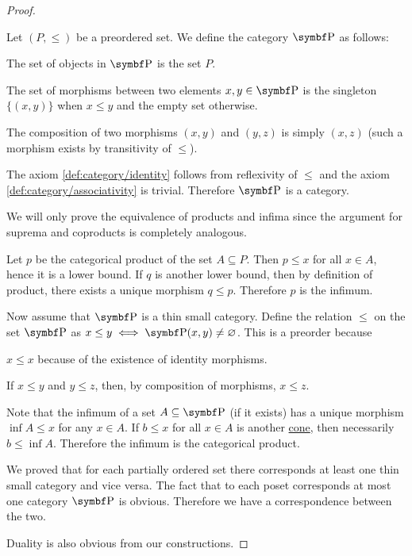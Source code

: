 \begin{proof}\mbox{}
  \begin{description}
    \Implies Let \( (P, \leq) \) be a preordered set. We define the category \( \Cat{P} \) as follows:
    \begin{description}
       The set of objects in \( \Cat{P} \) is the set \( P \).

       The set of morphisms between two elements \( x, y \in \Cat{P} \) is the singleton \( \{ (x, y) \} \) when \( x \leq y \) and the empty set otherwise.

       The composition of two morphisms \( (x, y) \) and \( (y, z) \) is simply \( (x, z) \) (such a morphism exists by transitivity of \( \leq \)).
    \end{description}

    The axiom \ref{def:category/identity} follows from reflexivity of \( \leq \) and the axiom \ref{def:category/associativity} is trivial. Therefore \( \Cat{P} \) is a category.

    We will only prove the equivalence of products and infima since the argument for suprema and coproducts is completely analogous.

    Let \( p \) be the categorical product of the set \( A \subseteq P \). Then \( p \leq x \) for all \( x \in A \), hence it is a lower bound. If \( q \) is another lower bound, then by definition of product, there exists a unique morphism \( q \leq p \). Therefore \( p \) is the infimum.

    \ImpliedBy Now assume that \( \Cat{P} \) is a thin small category. Define the relation \( \leq \) on the set \( \Cat{P} \) as \( x \leq y \iff \Cat{P}(x, y) \neq \varnothing \). This is a preorder because
    \begin{description}
       \( x \leq x \) because of the existence of identity morphisms.

       If \( x \leq y \) and \( y \leq z \), then, by composition of morphisms, \( x \leq z \).
    \end{description}

    Note that the infimum of a set \( A \subseteq \Cat{P} \) (if it exists) has a unique morphism \( \inf A \leq x \) for any \( x \in A \). If \( b \leq x \) for all \( x \in A \) is another \hyperref[def:categorical_cone]{cone}, then necessarily \( b \leq \inf A \). Therefore the infimum is the categorical product.
  \end{description}

  We proved that for each partially ordered set there corresponds at least one thin small category and vice versa. The fact that to each poset corresponds at most one category \( \Cat{P} \) is obvious. Therefore we have a correspondence between the two.

  Duality is also obvious from our constructions.
\end{proof}

